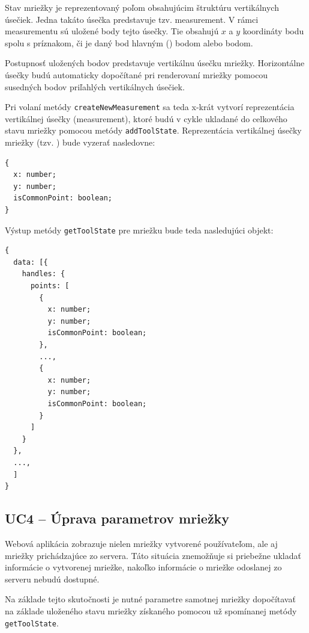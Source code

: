 Stav mriežky je reprezentovaný poľom obsahujúcim štruktúru vertikálnych úsečiek. Jedna takáto úsečka predstavuje tzv. measurement. V rámci measurementu sú uložené body tejto úsečky. Tie obsahujú $x$ a $y$ koordináty bodu spolu s príznakom, či je daný bod hlavným () bodom alebo\newline {} bodom.

Postupnosť uložených bodov predstavuje vertikálnu úsečku mriežky. Horizontálne úsečky budú automaticky dopočítané pri renderovaní mriežky pomocou susedných bodov priľahlých vertikálnych úsečiek.

Pri volaní metódy \texttt{createNewMeasurement} sa teda x-krát vytvorí reprezentácia vertikálnej úsečky (measurement), ktoré budú v cykle ukladané do celkového stavu mriežky pomocou metódy \texttt{addToolState}. Reprezentácia vertikálnej úsečky mriežky (tzv. ) bude vyzerať nasledovne:

\begin{minipage}[]{\linewidth}
\begin{verbatim}
{
  x: number;
  y: number;
  isCommonPoint: boolean;
}
\end{verbatim}
\end{minipage}
Výstup metódy \texttt{getToolState} pre mriežku bude teda nasledujúci objekt:

\begin{minipage}[]{\linewidth}
\begin{verbatim}
{
  data: [{
    handles: {
      points: [
        {
          x: number;
          y: number;
          isCommonPoint: boolean;
        },
        ...,
        {
          x: number;
          y: number;
          isCommonPoint: boolean;
        }
      ]
    }
  },
  ...,
  ]
}
\end{verbatim}
\end{minipage}

\subsection {UC4 -- Úprava parametrov mriežky}
Webová aplikácia zobrazuje nielen mriežky vytvorené používateľom, ale aj mriežky prichádzajúce zo servera. Táto situácia znemožňuje si priebežne ukladať informácie o vytvorenej mriežke, nakoľko informácie o mriežke odoslanej zo serveru nebudú dostupné.

Na základe tejto skutočnosti je nutné parametre samotnej mriežky dopočítavať na základe uloženého stavu mriežky získaného pomocou už spomínanej metódy \texttt{getToolState}.

